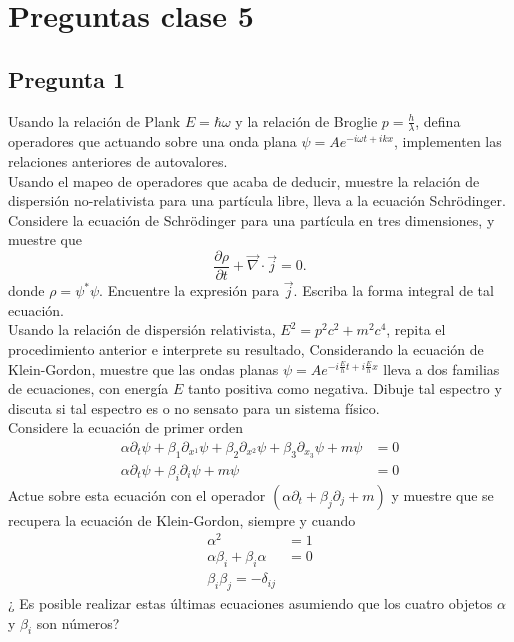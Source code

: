 \documentclass[../main_ej.tex]{subfiles}
\begin{document}
\section{Preguntas clase 5}

\subsection{Pregunta 1}
Usando la relación de Plank  $E=\hbar \omega$ y la relación de Broglie $p=\frac{h}{\lambda}$, defina operadores que actuando sobre una onda plana $\psi=Ae^{-i\omega t+ikx}$, implementen las relaciones anteriores de autovalores. \\
Usando el mapeo de operadores que acaba de deducir, muestre la relación de dispersión no-relativista para una partícula libre, lleva a la ecuación Schrödinger. \\
Considere la ecuación de Schrödinger para una partícula en tres dimensiones, y muestre que
\begin{equation*}
  \frac{\partial \rho}{\partial t} + \vec{\nabla} \cdot \vec{j} = 0.
\end{equation*}
donde $\rho=\psi^*\psi$. Encuentre la expresión para $\vec{j}$. Escriba la forma integral de tal ecuación. \\
Usando la relación de dispersión relativista, $E^2=p^2c^2 + m^2c^4$, repita el procedimiento anterior e interprete su resultado, Considerando la ecuación de Klein-Gordon, muestre que las ondas planas $  \psi=Ae^{-i\frac{E}{h}t + i\frac{E}{h}x}$ lleva a dos familias de ecuaciones, con energía $E$ tanto positiva como negativa. Dibuje tal espectro y discuta si tal espectro es  o no sensato para un sistema físico.\\
Considere la ecuación de primer orden 
\begin{align*}
  \alpha \partial_t \psi +\beta_1 \partial_{x^1}\psi + \beta_2 \partial_{x^2}\psi + \beta_3\partial_{x_3}\psi + m\psi  & = 0 \\
  \alpha \partial_t \psi + \beta_i \partial_i\psi + m\psi & = 0
\end{align*}
Actue sobre esta ecuación con el operador $(\alpha \partial_t+\beta_j\partial_j + m)$ y muestre que se recupera la ecuación de Klein-Gordon, siempre y cuando
\begin{align*}
  \alpha^2  & = 1 \\
  \alpha \beta_i + \beta_i \alpha & = 0 \\
  \beta_i\beta_j = -\delta_{ij}
\end{align*}
¿ Es posible realizar estas últimas ecuaciones asumiendo que los cuatro objetos $\alpha$ y $\beta_i$ son números? \\
\end{document}
